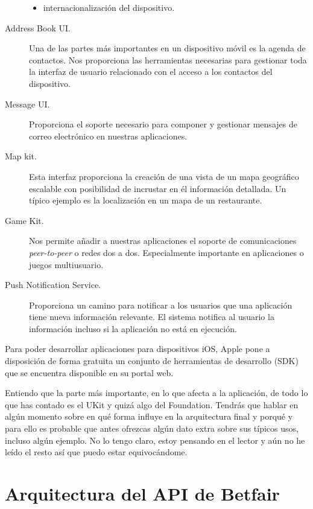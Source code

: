 \begin{description}
\begin{itemize}
			\item internacionalización del dispositivo.
		\end{itemize}
	\item [Address Book UI.] Una de las partes más importantes en un dispositivo móvil es la agenda de contactos. Nos proporciona las herramientas necesarias para gestionar toda la interfaz de usuario relacionado con el acceso a los contactos del dispositivo.
	\item [Message UI.] Proporciona el soporte necesario para componer y gestionar mensajes de correo electrónico en nuestras aplicaciones.
	\item [Map kit.]  Esta interfaz proporciona la creación de una vista de un mapa geográfico escalable con posibilidad de incrustar en él información detallada. Un típico ejemplo es la localización en un mapa de un restaurante.
	\item [Game Kit.] Nos permite añadir a nuestras aplicaciones el soporte de comunicaciones \emph{peer-to-peer} o redes dos a dos. Especialmente importante en aplicaciones  o juegos multiusuario.
	\item [Push Notification Service.] Proporciona un camino para notificar a los usuarios que una aplicación tiene nueva información relevante. El sistema notifica al usuario la información incluso si la aplicación no está en ejecución.

\end{description}

 Para poder desarrollar aplicaciones para dispositivos iOS, Apple pone a disposición de forma gratuita un conjunto de herramientas de desarrollo (SDK) que se encuentra disponible en su portal web. %

\begin{afixme}
  Entiendo que la parte más importante, en lo que afecta a la  aplicación, de todo lo que has contado es el UKit y quizá algo del Foundation. Tendrás que hablar en algún momento sobre en qué forma influye en la arquitectura final y porqué y para ello es probable que antes ofrezcas algún dato extra sobre sus típicos usos, incluso algún ejemplo. No lo tengo claro, estoy pensando en el lector y aún no he leído el resto así que puedo estar equivocándome.
\end{afixme}

\section{Arquitectura del API de Betfair}

